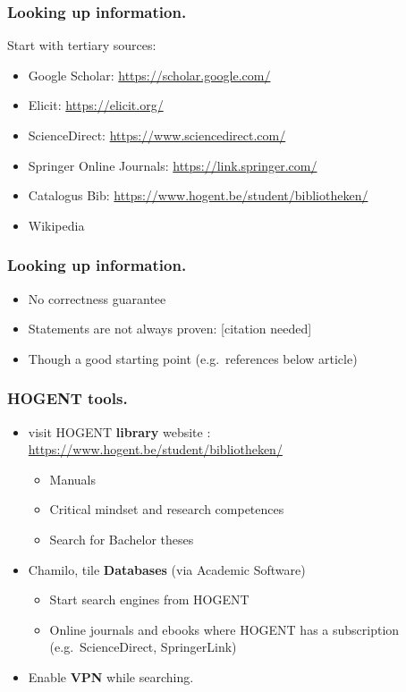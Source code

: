 \documentclass[aspectratio=169]{beamer}
\begin{document}
\begin{frame}
    \frametitle{Looking up information.}

    Start with \alert{tertiary} sources:

    \begin{itemize}
        \item Google Scholar: \url{https://scholar.google.com/}
        \item Elicit: \url{https://elicit.org/}
        \item ScienceDirect: \url{https://www.sciencedirect.com/}
        \item Springer Online Journals: \url{https://link.springer.com/}
        \item Catalogus Bib: \url{https://www.hogent.be/student/bibliotheken/}
        \item Wikipedia
    \end{itemize}
\end{frame}

\begin{frame}
    \frametitle{Looking up information.}


    {\pause}

    \begin{itemize}
        \item No correctness guarantee
        \item Statements are not always proven: [citation needed]
        \item \alert{Though} a good starting point (e.g.\ references below article)
    \end{itemize}
\end{frame}

\begin{frame}
    \frametitle{HOGENT tools.}

    \begin{itemize}
        \item<+-> visit HOGENT \textbf{library} website : \url{https://www.hogent.be/student/bibliotheken/}
            \begin{itemize}
                \item Manuals
                \item Critical mindset and research competences
                \item Search for Bachelor theses
            \end{itemize}
        \item<+-> Chamilo, tile \textbf{Databases} (via Academic Software)
            \begin{itemize}
                \item Start search engines from HOGENT
                \item Online journals and ebooks where HOGENT has a subscription (e.g.~ScienceDirect, SpringerLink)
            \end{itemize}
        \item<+-> Enable \textbf{VPN} while searching.
    \end{itemize}
\end{frame}
\end{document}
